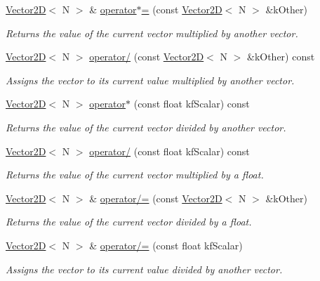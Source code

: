 \begin{DoxyCompactItemize}
\hyperlink{class_vector2_d}{Vector2\+D}$<$ N $>$ \& \hyperlink{class_vector2_d_a6ff7b67451e0c66d58e1844d02598e49}{operator$\ast$=} (const \hyperlink{class_vector2_d}{Vector2\+D}$<$ N $>$ \&k\+Other)
\begin{DoxyCompactList}\small\item\em Returns the value of the current vector multiplied by another vector. \end{DoxyCompactList}\item 
\hyperlink{class_vector2_d}{Vector2\+D}$<$ N $>$ \hyperlink{class_vector2_d_ab166d50dcd7fe7650982ec8ae7a87d1f}{operator/} (const \hyperlink{class_vector2_d}{Vector2\+D}$<$ N $>$ \&k\+Other) const 
\begin{DoxyCompactList}\small\item\em Assigns the vector to its current value multiplied by another vector. \end{DoxyCompactList}\item 
\hyperlink{class_vector2_d}{Vector2\+D}$<$ N $>$ \hyperlink{class_vector2_d_a23981e8ae406ff535d8b08863d332965}{operator$\ast$} (const float kf\+Scalar) const 
\begin{DoxyCompactList}\small\item\em Returns the value of the current vector divided by another vector. \end{DoxyCompactList}\item 
\hyperlink{class_vector2_d}{Vector2\+D}$<$ N $>$ \hyperlink{class_vector2_d_ae4dbe6b165e3def7664dfbc522bf25ac}{operator/} (const float kf\+Scalar) const 
\begin{DoxyCompactList}\small\item\em Returns the value of the current vector multiplied by a float. \end{DoxyCompactList}\item 
\hyperlink{class_vector2_d}{Vector2\+D}$<$ N $>$ \& \hyperlink{class_vector2_d_a2057096e75e930ca74ddcf25aa114da7}{operator/=} (const \hyperlink{class_vector2_d}{Vector2\+D}$<$ N $>$ \&k\+Other)
\begin{DoxyCompactList}\small\item\em Returns the value of the current vector divided by a float. \end{DoxyCompactList}\item 
\hyperlink{class_vector2_d}{Vector2\+D}$<$ N $>$ \& \hyperlink{class_vector2_d_a559a75132a11f73c1d8f9cc548f14fd2}{operator/=} (const float kf\+Scalar)
\begin{DoxyCompactList}\small\item\em Assigns the vector to its current value divided by another vector. \end{DoxyCompactList}\item 

\end{DoxyCompactItemize}
